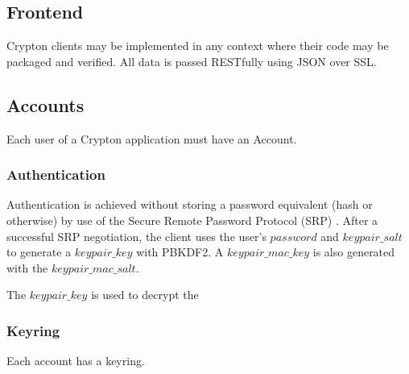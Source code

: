 \documentclass[conference]{IEEEtran}
\begin{document}
\subsection{Frontend}
Crypton clients may be implemented in any context where their code may be
packaged and verified. All data is passed RESTfully using JSON over SSL.

\subsection{Accounts}
Each user of a Crypton application must have an Account.

\subsubsection{Authentication}
Authentication is achieved without storing a password equivalent
(hash or otherwise) by use of the Secure Remote Password Protocol (SRP)
\cite{srp-protocol}. After a successful SRP negotiation, the client uses
the user's \(password\) and \(keypair\_salt\) to generate a \(keypair\_key\)
with PBKDF2\cite{pbkdf2}. A \(keypair\_mac\_key\) is also generated with
the \(keypair\_mac\_salt\).

The \(keypair\_key\) is used to decrypt the 

\subsubsection{Keyring}
Each account has a keyring.
\end{document}
